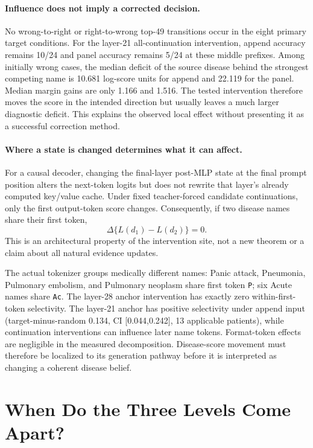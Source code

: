 \documentclass[11pt]{article}
\begin{document}
\paragraph{Influence does not imply a corrected decision.}
No wrong-to-right or right-to-wrong top-49 transitions occur in the eight primary target conditions. For the layer-21 all-continuation intervention, append accuracy remains 10/24 and panel accuracy remains 5/24 at these middle prefixes. Among initially wrong cases, the median deficit of the source disease behind the strongest competing name is 10.681 log-score units for append and 22.119 for the panel. Median margin gains are only 1.166 and 1.516. The tested intervention therefore moves the score in the intended direction but usually leaves a much larger diagnostic deficit. This explains the observed local effect without presenting it as a successful correction method.

\paragraph{Where a state is changed determines what it can affect.}
For a causal decoder, changing the final-layer post-MLP state at the final prompt position alters the next-token logits but does not rewrite that layer's already computed key/value cache. Under fixed teacher-forced candidate continuations, only the first output-token score changes. Consequently, if two disease names share their first token,
\begin{equation}
 \Delta\{L(d_1)-L(d_2)\}=0.
\end{equation}
This is an architectural property of the intervention site, not a new theorem or a claim about all natural evidence updates.

The actual tokenizer groups medically different names: Panic attack, Pneumonia, Pulmonary embolism, and Pulmonary neoplasm share first token \texttt{P}; six Acute names share \texttt{Ac}. The layer-28 anchor intervention has exactly zero within-first-token selectivity. The layer-21 anchor has positive selectivity under append input (target-minus-random 0.134, CI [0.044,0.242], 13 applicable patients), while continuation interventions can influence later name tokens. Format-token effects are negligible in the measured decomposition. Disease-score movement must therefore be localized to its generation pathway before it is interpreted as changing a coherent disease belief.

\section{When Do the Three Levels Come Apart?}
\label{sec:conditions}
\end{document}

